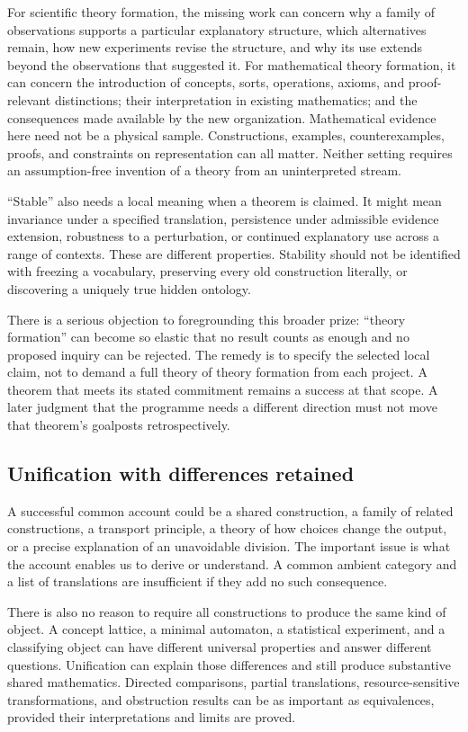\documentclass[11pt]{article}
\begin{document}
For scientific theory formation, the missing work can concern why a family of observations supports a particular explanatory structure, which alternatives remain, how new experiments revise the structure, and why its use extends beyond the observations that suggested it. For mathematical theory formation, it can concern the introduction of concepts, sorts, operations, axioms, and proof-relevant distinctions; their interpretation in existing mathematics; and the consequences made available by the new organization. Mathematical evidence here need not be a physical sample. Constructions, examples, counterexamples, proofs, and constraints on representation can all matter. Neither setting requires an assumption-free invention of a theory from an uninterpreted stream.

``Stable'' also needs a local meaning when a theorem is claimed. It might mean invariance under a specified translation, persistence under admissible evidence extension, robustness to a perturbation, or continued explanatory use across a range of contexts. These are different properties. Stability should not be identified with freezing a vocabulary, preserving every old construction literally, or discovering a uniquely true hidden ontology.

There is a serious objection to foregrounding this broader prize: ``theory formation'' can become so elastic that no result counts as enough and no proposed inquiry can be rejected. The remedy is to specify the selected local claim, not to demand a full theory of theory formation from each project. A theorem that meets its stated commitment remains a success at that scope. A later judgment that the programme needs a different direction must not move that theorem's goalposts retrospectively.

\subsection{Unification with differences retained}

A successful common account could be a shared construction, a family of related constructions, a transport principle, a theory of how choices change the output, or a precise explanation of an unavoidable division. The important issue is what the account enables us to derive or understand. A common ambient category and a list of translations are insufficient if they add no such consequence.

There is also no reason to require all constructions to produce the same kind of object. A concept lattice, a minimal automaton, a statistical experiment, and a classifying object can have different universal properties and answer different questions. Unification can explain those differences and still produce substantive shared mathematics. Directed comparisons, partial translations, resource-sensitive transformations, and obstruction results can be as important as equivalences, provided their interpretations and limits are proved.
\end{document}
